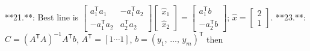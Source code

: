 

**21.**: Best line is \(\begin{bmatrix}a_{1}^{\mathsf{T}}a_{1}&-a_{1}^{\mathsf{T}}a_{2}\\ -a_{1}^{\mathsf{T}}a_{2}&a_{2}^{\mathsf{T}}a_{2}\end{bmatrix}\begin{bmatrix} \widehat{x}_{1}\\ \widehat{x}_{2}\end{bmatrix}=\begin{bmatrix}a_{1}^{\mathsf{T}}b\\ -a_{2}^{\mathsf{T}}b\end{bmatrix}\); \(\widehat{x}=\begin{bmatrix}2\\ 1\end{bmatrix}\).
**23.**: \(C=(A^{\mathsf{T}}A)^{-1}A^{\mathsf{T}}b\), \(A^{\mathsf{T}}=[1\cdots 1]\), \(b=(y_{1},\,\ldots,\,y_{m})^{\mathsf{T}}\) then


